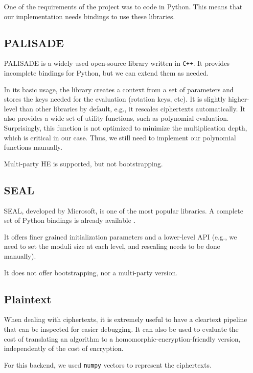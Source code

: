 \documentclass[a4paper,11pt,oneside]{report}
\begin{document}
One of the requirements of the project was to code in Python. 
This means that our implementation needs bindings to use these libraries.

\subsection{PALISADE}

PALISADE is a widely used open-source library written in \texttt{C++}. 
It provides incomplete bindings for Python, but we can extend them as needed. 

In its basic usage, the library creates a context from a set of parameters and stores the keys needed for the evaluation (rotation keys, etc). 
It is slightly higher-level than other libraries by default, e.g., it rescales ciphertexts automatically. 
It also provides a wide set of utility functions, such as polynomial evaluation. 
Surprisingly, this function is not optimized to minimize the multiplication depth, which is critical in our case.
Thus, we still need to implement our polynomial functions manually.

Multi-party HE is supported, but not bootstrapping.

\subsection{SEAL}

SEAL, developed by Microsoft, is one of the most popular libraries. 
A complete set of Python bindings is already available \cite{hugang_seal-python_2022}.

It offers finer grained initialization parameters and a lower-level API (e.g., we need to set the moduli size at each level, and rescaling needs to be done manually).

It does not offer bootstrapping, nor a multi-party version.

\subsection{Plaintext}

When dealing with ciphertexts, it is extremely useful to have a cleartext pipeline that can be inspected for easier debugging. 
It can also be used to evaluate the cost of translating an algorithm to a homomorphic-encryption-friendly version, independently of the cost of encryption. 

For this backend, we used \texttt{numpy} vectors to represent the ciphertexts.
\end{document}
